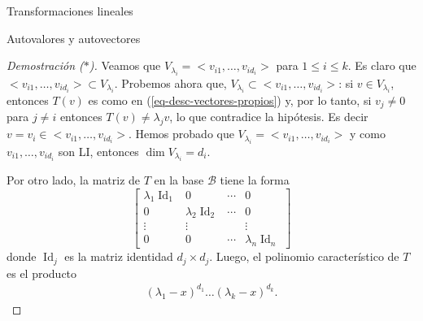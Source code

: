 \documentclass[a4paper,12pt,twoside,spanish,reqno]{amsbook}
\theoremstyle{definition}
\theoremstyle{remark}
\newcommand{\Id}{\operatorname{Id}}
\begin{document}
\begin{chapter}{Transformaciones lineales}
\begin{section}{Autovalores y autovectores}
\begin{proof}[Demostración ($*$)]
			Veamos que $V_{\lambda_i} = <v_{i1},\ldots,v_{id_i}>$ para $1 \le i \le k$. Es claro que  $<v_{i1},\ldots,v_{id_i}> \subset V_{\lambda_i}$. Probemos  ahora que,  $V_{\lambda_i} \subset <v_{i1},\ldots,v_{id_i}>$: si  $v \in V_{\lambda_i}$,  entonces $T(v)$ es como en (\ref{eq-desc-vectores-propios}) y, por lo tanto, si $v_j \ne 0$ para $j\not=i$ entonces $T(v) \ne \lambda_j v$, lo que contradice la hipótesis. Es decir $v = v_i \in <v_{i1},\ldots,v_{id_i}>$. Hemos probado que    $V_{\lambda_i} = <v_{i1},\ldots,v_{id_i}>$ y como $v_{i1},\ldots,v_{id_i}$ son LI, entonces $\dim V_{\lambda_i} = d_i$.
			
			Por otro lado, la matriz de $T$ en la base $\mathcal{B}$ tiene la forma
			\begin{equation*}
				\begin{bmatrix}
				\lambda_1 \Id_1 &0&\cdots&0 \\0&\lambda_2 \Id_2&\cdots&0 \\\vdots&\vdots&&\vdots \\0&0&\cdots&\lambda_n \Id_n 
				\end{bmatrix}
			\end{equation*}
			donde $\Id_j$ es la matriz identidad $d_j \times d_j$. Luego,  el polinomio característico de $T$ es el producto
			\begin{align*}
				(\lambda_1 -x)^{d_1}\ldots(\lambda_k- x)^{d_k}.
			\end{align*}
		\end{proof}
	

\end{section}
\end{chapter}
\end{document}

